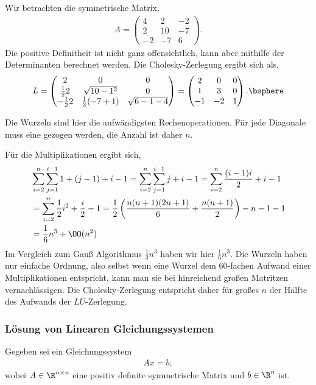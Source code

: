\begin{bspn} Wir betrachten die symmetrische Matrix,
\begin{align*}
A = \begin{pmatrix}
4 & 2 & -2\\
2 & 10 & -7\\
-2 & -7 & 6
\end{pmatrix}.
\end{align*}
Die positive Definitheit ist nicht ganz offensichtlich, kann aber mithilfe der
Determinanten berechnet werden. Die Cholesky-Zerlegung ergibt sich als,
\begin{align*}
L =
\begin{pmatrix}
2 & 0 & 0\\
\frac{1}{2}2 & \sqrt{10 - 1^2} & 0\\
-\frac{1}{2}2 & \frac{1}{3}(-7+1)&  \sqrt{6 - 1 - 4}
\end{pmatrix}
= \begin{pmatrix}
  2 & 0 & 0\\
  1 & 3 & 0\\
 -1 & -2 & 1
  \end{pmatrix}.\bsphere
\end{align*}
\end{bspn}

\begin{bemn}[Rechenaufwand.]
Die Wurzeln sind hier die aufwändigsten Rechenoperationen. Für jede Diagonale
muss eine gezogen werden, die Anzahl ist daher $n$.

Für die Multiplikationen ergibt sich,
\begin{align*}
&\sum\limits_{i=2}^n\sum\limits_{j=1}^{i-1} 1 + (j-1) + i-1
= \sum\limits_{i=2}^n\sum\limits_{j=1}^{i-1} j + i-1
= \sum\limits_{i=2}^n\frac{(i-1)i}{2} + i-1\\
&= \sum\limits_{i=2}^n\frac{1}{2}i^2 + \frac{i}{2} -1= \frac{1}{2}\left(\frac{n(n+1)(2n+1)}{6} + \frac{n(n+1)}{2}\right) - n-1 -
1\\
&= \frac{1}{6}n^3 + \OO(n^2)
\end{align*}
Im Vergleich zum Gauß Algorithmus $\frac{1}{3}n^3$ haben wir hier
$\frac{1}{6}n^3$. Die Wurzeln haben nur einfache Ordnung, also selbst wenn eine
Wurzel dem 60-fachen Aufwand einer Multiplikationen entspricht, kann man sie
bei hinreichend großen Matritzen vernachlässigen. Die Cholesky-Zerlegung
entspricht daher für großes $n$ der Hälfte des Aufwands der $LU$-Zerlegung.
\end{bemn}

\subsubsection{Lösung von Linearen Gleichungssystemen}
Gegeben sei ein Gleichungssystem
\begin{align*}
Ax = b,
\end{align*}
wobei $A\in\R^{n\times n}$ eine positiv definite symmetrische Matrix und
$b\in\R^n$ ist.

